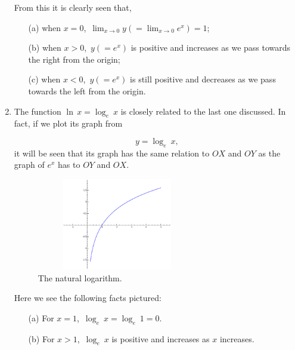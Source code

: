 \begin{enumerate}
From this it is clearly seen that,

\begin{itemize}
\item[(a)] 
when $x = 0$,\ $\lim_{x \to 0} y (= \lim_{x \to 0} e^x) = 1$;

\item[(b)] 
when $x > 0$,\ $y (= e^x)$ is positive and increases as we pass 
towards the right from the origin;

\item[(c)] 
when $x < 0$,\ $y (= e^x)$ is still positive and decreases as 
we pass towards the left from the origin.

\end{itemize}

\item
The function $\ln \, x = \log_e\ x$ is closely related to the last one 
discussed. In fact, if we plot its graph from

\[
    y = \log_e\ x,
\]
it will be seen that its graph has the same relation to 
$OX$ and $OY$ as the graph of $e^x$ has to $OY$ and $OX$.

\begin{figure}[h!]
\begin{minipage}{\textwidth}
\begin{center}
\includegraphics[height=4cm,width=7cm]{ln.eps}
\end{center}
\end{minipage}
\caption{The natural logarithm.}
\label{fig:ln(x)}
\end{figure}


Here we see the following facts pictured:

\begin{itemize}
\item[(a)] 
For $x = 1$,\ $\log_e\ x = \log_e\ 1 = 0$.

\item[(b)] 
For $x > 1$,\ $\log_e\ x$ is positive and increases as $x$ increases.


\end{itemize}
\end{enumerate}
